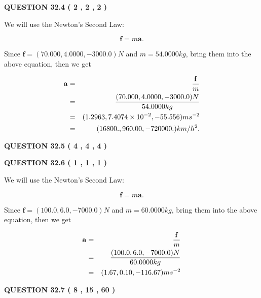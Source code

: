 \documentclass[12pt]{article}
\begin{document}
{\textbf{\Large{QUESTION
32.4 
 (           2 ,           2 ,           2 )
}}}
  
  
 
 

We will use the Newton's Second Law:
 
\[
\mathbf{f}=m\mathbf{a}.
\]
 
Since $\mathbf{f}=( %
70.000,  %
4.0000,  %
-3000.0 )N$
and $m= %
54.0000kg$, bring them into the above equation, then we get
 
\begin{eqnarray*}
\mathbf{a}&=&\frac{\mathbf{f}}m  \\
&=&\frac{(
70.000 ,
4.0000 ,
-3000.0 )N
}{ %
54.0000 kg}  \\
&=&(
1.2963 ,
7.4074 \times 10^{-2},
-55.556
)ms^{-2} \\
&=&(
16800. ,
960.00 ,
-720000.
)km/h^2.
\end{eqnarray*}
 
 
 
  
\vspace{0.2in}
  
{\textbf{\Large{QUESTION
32.5 
 (           4 ,           4 ,           4 )
}}}
  
  
  
\vspace{0.2in}
  
{\textbf{\Large{QUESTION
32.6 
 (           1 ,           1 ,           1 )
}}}
  
  


 
 

We will use the Newton's Second Law:
 
\[
\mathbf{f}=m\mathbf{a}.
\]
 
Since $\mathbf{f}= %
(100.0 , 6.0 , -7000.0) N$
and $m= %
60.0000kg$, bring them into the above equation, then we get
 
\begin{eqnarray*}
\mathbf{a}&=&\frac{\mathbf{f}}m  \\
&=&\frac{ %
(100.0 , 6.0 , -7000.0) N}{ %
60.0000kg}  \\
&=& %
(1.67 , 0.10 , -116.67) ms^{-2}
\end{eqnarray*}
 
 
 
  
\vspace{0.2in}
  
{\textbf{\Large{QUESTION
32.7 
 (           8 ,          15 ,          60 )
}}}
  
\end{document}
